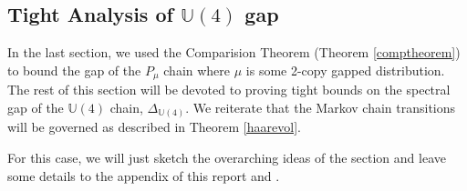 \documentclass[12pt]{amsart}
\theoremstyle{definition}
\theoremstyle{remark}
\numberwithin{equation}{section}
\theoremstyle{remark}
\begin{document}
\subsection{Tight Analysis of $\mathbb{U}(4)$ gap}
In the last section, we used the Comparision Theorem (Theorem \ref{comptheorem}) to bound the gap of the $P_\mu$ chain where $\mu$ is some 2-copy gapped distribution. The rest of this section will be devoted to proving tight bounds on the spectral gap of the $\mathbb{U}(4)$ chain, $\Delta_{\mathbb{U}(4)}$. We reiterate that the Markov chain transitions will be governed as described in Theorem \ref{haarevol}. \newline

For this case, we will just sketch the overarching ideas of the section and leave some details to the appendix of this report and \cite{harrlow}. 


\newpage


\end{document}
